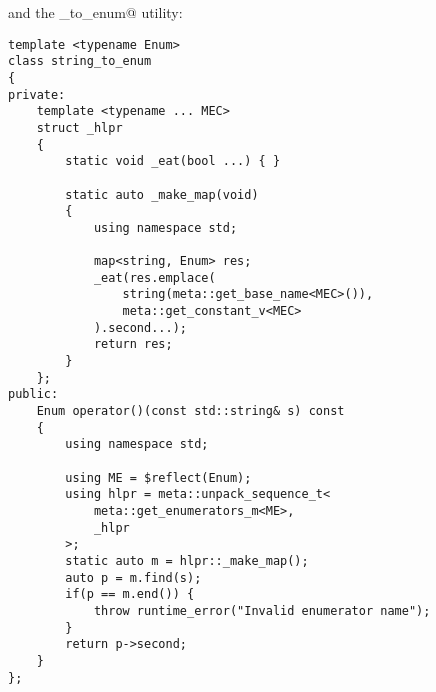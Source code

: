 and the \verb@string_to_enum@ utility:

\begin{verbatim}
template <typename Enum>
class string_to_enum
{
private:
	template <typename ... MEC>
	struct _hlpr
	{
		static void _eat(bool ...) { }

		static auto _make_map(void)
		{
			using namespace std;

			map<string, Enum> res;
			_eat(res.emplace(
				string(meta::get_base_name<MEC>()),
				meta::get_constant_v<MEC>
			).second...);
			return res;
		}
	};
public:
	Enum operator()(const std::string& s) const
	{
		using namespace std;

		using ME = $reflect(Enum);
		using hlpr = meta::unpack_sequence_t<
			meta::get_enumerators_m<ME>,
			_hlpr
		>;
		static auto m = hlpr::_make_map();
		auto p = m.find(s);
		if(p == m.end()) {
			throw runtime_error("Invalid enumerator name");
		}
		return p->second;
	}
};
\end{verbatim}

